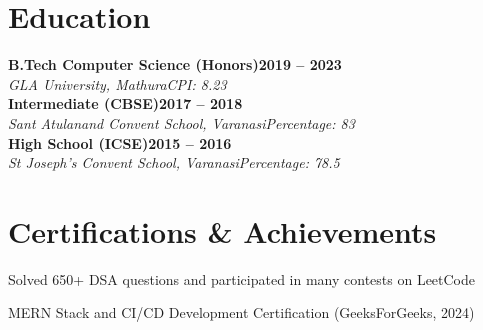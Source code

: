 \documentclass[letterpaper, 10pt]{article}
\newcommand{\heading}[2]{ \hspace{6pt}#1\hfill#2\\[0.8pt] }
\newcommand{\headingBf}[2]{ \heading{\textbf{#1}}{\textbf{#2}} }
\newcommand{\headingIt}[2]{ \heading{\textit{#1}}{\textit{#2}} }
\newenvironment{resume_list}{
\vspace{-5pt}
\begin{itemize}[itemsep=-3pt, parsep=0.2pt, leftmargin=20pt] }{ \end{itemize}
\vspace{-4pt}
}
\begin{document}
	\section{Education}
	\vspace{-1pt}
	\headingBf{B.Tech Computer Science (Honors)}{2019 -- 2023} \headingIt{GLA University, Mathura}{CPI: 8.23}
	\headingBf{Intermediate (CBSE)}{2017 -- 2018} \headingIt{Sant Atulanand Convent School, Varanasi}{Percentage: 83}
	\headingBf{High School (ICSE)}{2015 -- 2016} \headingIt{St Joseph's Convent School, Varanasi}{Percentage: 78.5}

	\section{Certifications \& Achievements}
	\begin{resume_list}
		\item Solved 650+ DSA questions and participated in many contests on
		LeetCode \href{https://leetcode.com/u/KeshariPiyush24/}{\faLink}
		\vspace{1pt}
		\item MERN Stack and CI/CD Development Certification (GeeksForGeeks, 2024) \href{https://media.geeksforgeeks.org/certificates/1706532819/013b39c1dda8d49bf888496b0d0d6b1b.pdf}{\faLink}
	\end{resume_list}
\end{document}
